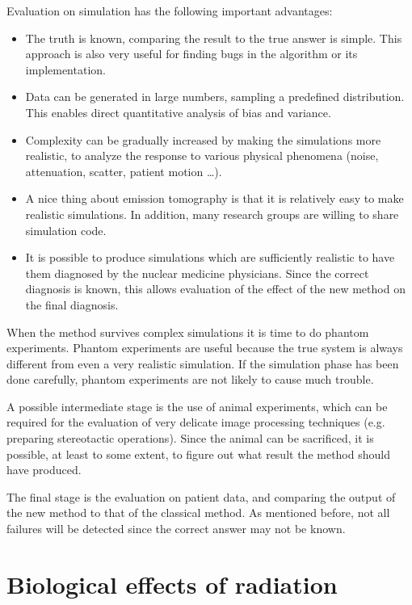\documentclass[11pt,oneside]{article}
\begin{document}
Evaluation on simulation has the following important advantages:
\begin{itemize}
  \item The truth is known, comparing the result to the true answer is simple.
        This approach is also very useful for finding bugs in the algorithm or
        its implementation.
  \item Data can be generated in large numbers, sampling a predefined
        distribution. This enables direct quantitative analysis of bias and
        variance.
  \item Complexity can be gradually increased by making the simulations more
        realistic, to analyze the response to various physical phenomena
        (noise, attenuation, scatter, patient motion \ldots).
  \item A nice thing about emission tomography is that it is relatively easy
        to make realistic simulations. In addition, many research groups are
        willing to share simulation code.
  \item It is possible to produce simulations which are sufficiently realistic
        to have them diagnosed by the nuclear medicine physicians. Since the
        correct diagnosis is known, this allows evaluation of the effect of
        the new method on the final diagnosis.
\end{itemize}

When the method survives complex simulations it is time to do phantom
experiments. Phantom experiments are useful because the true system is always
different from even a very realistic simulation. If the simulation phase has
been done carefully, phantom experiments are not likely to cause much trouble.

A possible intermediate stage is the use of animal experiments, which can be
required for the evaluation of very delicate image processing techniques
(e.g. preparing stereotactic operations). Since the animal can be sacrificed,
it is possible, at least to some extent, to figure out what result the method
should have produced.

The final stage is the evaluation on patient data, and comparing the output of
the new method to that of the classical method. As mentioned before, not all
failures will be detected since the correct answer may not be known.

\section{Biological effects of radiation} \label{chap:biol}
\end{document}
